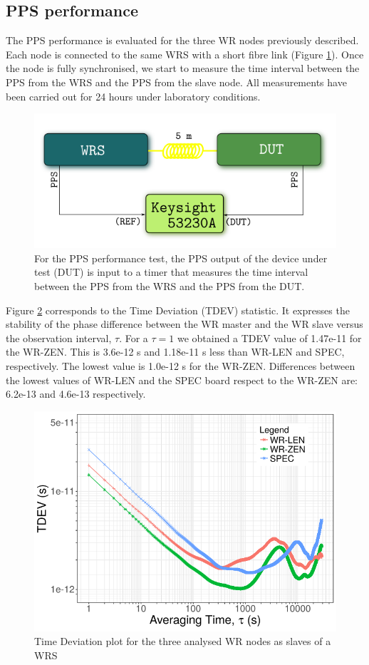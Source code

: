 \subsection{PPS performance}
\label{subsec:pps_performance}

The PPS performance is evaluated for the three WR nodes previously described. 
Each node is connected to the same WRS with a short fibre link (Figure 
\ref{fig:prueba1pps}). Once the node is fully synchronised, we start to 
measure the time interval between the PPS from the WRS and the PPS from the 
slave node. All measurements have been carried out for 24 hours under laboratory conditions.

\begin{figure}[H]
	\centering
	\includegraphics[width=0.7\linewidth]{img/prueba1_pps}
	\caption[Connection diagram for the PPS performance test.]{For the PPS 
	performance test, the PPS output of the device under test (DUT) is input to 
	a timer that measures the time interval between the PPS from the WRS and 
	the PPS from the DUT.}
	\label{fig:prueba1pps}
\end{figure}


Figure \ref{fig:tdev_exp1} corresponds to the Time Deviation (TDEV) statistic. 
It expresses the stability of the phase difference between the WR master and the 
WR slave versus the observation interval, $\tau$. For a $\tau=1$ we obtained a 
TDEV value of 1.47e-11 for the WR-ZEN. This is 3.6e-12 s and 1.18e-11 s less than WR-LEN and SPEC, respectively. The lowest value is 1.0e-12 s for the WR-ZEN. Differences between the lowest values of WR-LEN and the SPEC board respect to the WR-ZEN are: 6.2e-13 and 4.6e-13 respectively.

\begin{figure}
    \centering
    \includegraphics[width=0.7\linewidth]{img/tdev_exp1}
    \caption[TDEV for the WR devices comparison.]{Time Deviation plot for the three analysed WR nodes as slaves of a WRS}
    \label{fig:tdev_exp1}
\end{figure}

